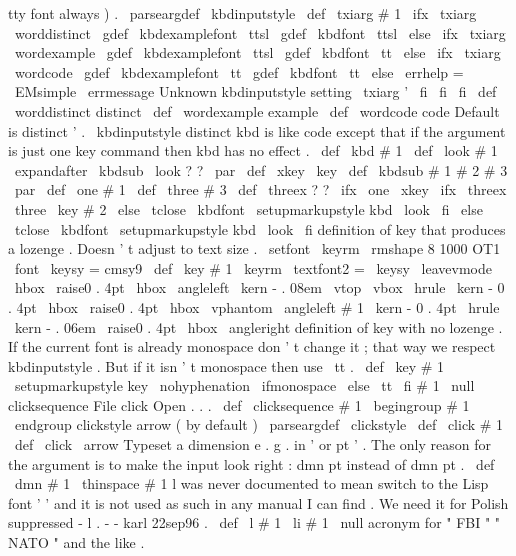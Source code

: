 {{tty
font
always
)
.
\
parseargdef
\
kbdinputstyle
{
%
\
def
\
txiarg
{
#
1
}
%
\
ifx
\
txiarg
\
worddistinct
\
gdef
\
kbdexamplefont
{
\
ttsl
}
\
gdef
\
kbdfont
{
\
ttsl
}
%
\
else
\
ifx
\
txiarg
\
wordexample
\
gdef
\
kbdexamplefont
{
\
ttsl
}
\
gdef
\
kbdfont
{
\
tt
}
%
\
else
\
ifx
\
txiarg
\
wordcode
\
gdef
\
kbdexamplefont
{
\
tt
}
\
gdef
\
kbdfont
{
\
tt
}
%
\
else
\
errhelp
=
\
EMsimple
\
errmessage
{
Unknown
kbdinputstyle
setting
\
txiarg
'
}
%
\
fi
\
fi
\
fi
}
\
def
\
worddistinct
{
distinct
}
\
def
\
wordexample
{
example
}
\
def
\
wordcode
{
code
}
%
Default
is
distinct
'
.
\
kbdinputstyle
distinct
%
kbd
is
like
code
except
that
if
the
argument
is
just
one
key
command
%
then
kbd
has
no
effect
.
\
def
\
kbd
#
1
{
{
\
def
\
look
{
#
1
}
\
expandafter
\
kbdsub
\
look
?
?
\
par
}
}
\
def
\
xkey
{
\
key
}
\
def
\
kbdsub
#
1
#
2
#
3
\
par
{
%
\
def
\
one
{
#
1
}
\
def
\
three
{
#
3
}
\
def
\
threex
{
?
?
}
%
\
ifx
\
one
\
xkey
\
ifx
\
threex
\
three
\
key
{
#
2
}
%
\
else
{
\
tclose
{
\
kbdfont
\
setupmarkupstyle
{
kbd
}
\
look
}
}
\
fi
\
else
{
\
tclose
{
\
kbdfont
\
setupmarkupstyle
{
kbd
}
\
look
}
}
\
fi
}
%
definition
of
key
that
produces
a
lozenge
.
Doesn
'
t
adjust
to
text
size
.
%
\
setfont
\
keyrm
\
rmshape
{
8
}
{
1000
}
{
OT1
}
%
\
font
\
keysy
=
cmsy9
%
\
def
\
key
#
1
{
{
\
keyrm
\
textfont2
=
\
keysy
\
leavevmode
\
hbox
{
%
%
\
raise0
.
4pt
\
hbox
{
\
angleleft
}
\
kern
-
.
08em
\
vtop
{
%
%
\
vbox
{
\
hrule
\
kern
-
0
.
4pt
%
\
hbox
{
\
raise0
.
4pt
\
hbox
{
\
vphantom
{
\
angleleft
}
}
#
1
}
}
%
%
\
kern
-
0
.
4pt
\
hrule
}
%
%
\
kern
-
.
06em
\
raise0
.
4pt
\
hbox
{
\
angleright
}
}
}
}
%
definition
of
key
with
no
lozenge
.
If
the
current
font
is
already
%
monospace
don
'
t
change
it
;
that
way
we
respect
kbdinputstyle
.
But
%
if
it
isn
'
t
monospace
then
use
\
tt
.
%
\
def
\
key
#
1
{
{
\
setupmarkupstyle
{
key
}
%
\
nohyphenation
\
ifmonospace
\
else
\
tt
\
fi
#
1
}
\
null
}
%
clicksequence
{
File
click
{
}
Open
.
.
.
}
\
def
\
clicksequence
#
1
{
\
begingroup
#
1
\
endgroup
}
%
clickstyle
arrow
(
by
default
)
\
parseargdef
\
clickstyle
{
\
def
\
click
{
#
1
}
}
\
def
\
click
{
\
arrow
}
%
Typeset
a
dimension
e
.
g
.
in
'
or
pt
'
.
The
only
reason
for
the
%
argument
is
to
make
the
input
look
right
:
dmn
{
pt
}
instead
of
dmn
{
}
pt
.
%
\
def
\
dmn
#
1
{
\
thinspace
#
1
}
%
l
was
never
documented
to
mean
switch
to
the
Lisp
font
'
'
%
and
it
is
not
used
as
such
in
any
manual
I
can
find
.
We
need
it
for
%
Polish
suppressed
-
l
.
-
-
karl
22sep96
.
%
\
def
\
l
#
1
{
{
\
li
#
1
}
\
null
}
%
acronym
for
"
FBI
"
"
NATO
"
and
the
like
.
%
}}
